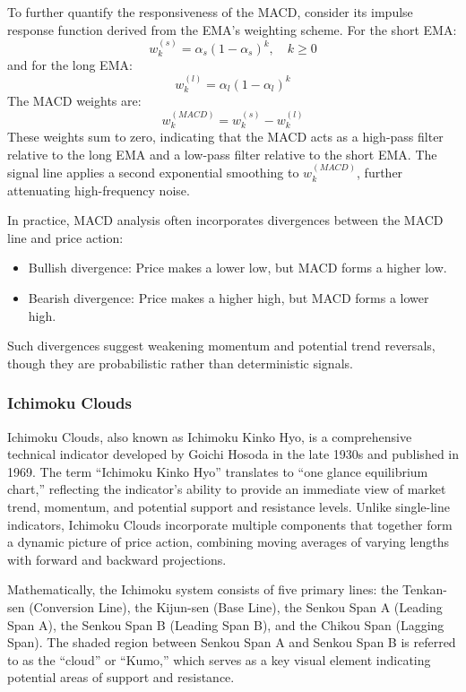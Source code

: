 To further quantify the responsiveness of the MACD, consider its impulse response function derived from the EMA's weighting scheme. For the short EMA:
\[
w_k^{(s)} = \alpha_s (1 - \alpha_s)^k, \quad k \ge 0
\]
and for the long EMA:
\[
w_k^{(l)} = \alpha_l (1 - \alpha_l)^k
\]
The MACD weights are:
\[
w_k^{(MACD)} = w_k^{(s)} - w_k^{(l)}
\]
These weights sum to zero, indicating that the MACD acts as a high-pass filter relative to the long EMA and a low-pass filter relative to the short EMA. The signal line applies a second exponential smoothing to $w_k^{(MACD)}$, further attenuating high-frequency noise.

In practice, MACD analysis often incorporates divergences between the MACD line and price action:
\begin{itemize}
    \item Bullish divergence: Price makes a lower low, but MACD forms a higher low.
    \item Bearish divergence: Price makes a higher high, but MACD forms a lower high.
\end{itemize}
Such divergences suggest weakening momentum and potential trend reversals, though they are probabilistic rather than deterministic signals.


\subsubsection{Ichimoku Clouds}

Ichimoku Clouds, also known as Ichimoku Kinko Hyo, is a comprehensive technical indicator developed by Goichi Hosoda in the late 1930s and published in 1969. The term “Ichimoku Kinko Hyo” translates to “one glance equilibrium chart,” reflecting the indicator’s ability to provide an immediate view of market trend, momentum, and potential support and resistance levels. Unlike single-line indicators, Ichimoku Clouds incorporate multiple components that together form a dynamic picture of price action, combining moving averages of varying lengths with forward and backward projections.

Mathematically, the Ichimoku system consists of five primary lines: the Tenkan-sen (Conversion Line), the Kijun-sen (Base Line), the Senkou Span A (Leading Span A), the Senkou Span B (Leading Span B), and the Chikou Span (Lagging Span). The shaded region between Senkou Span A and Senkou Span B is referred to as the “cloud” or “Kumo,” which serves as a key visual element indicating potential areas of support and resistance.

